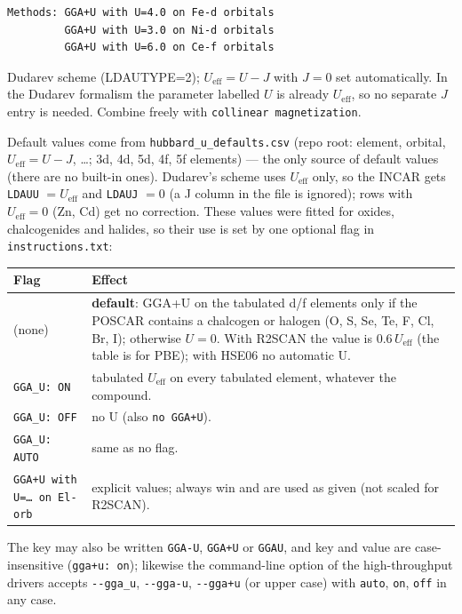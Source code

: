 \documentclass[11pt,a4paper]{scrartcl}
\newcommand{\thead}{\rowcolor{lightblue}}
\begin{document}
\begin{lstlisting}
Methods: GGA+U with U=4.0 on Fe-d orbitals
         GGA+U with U=3.0 on Ni-d orbitals
         GGA+U with U=6.0 on Ce-f orbitals
\end{lstlisting}

Dudarev scheme (LDAUTYPE=2); $U_{\mathrm{eff}} = U - J$ with $J = 0$ set
automatically.  In the Dudarev formalism the parameter labelled $U$ is already
$U_{\mathrm{eff}}$, so no separate $J$ entry is needed.
Combine freely with \texttt{collinear magnetization}.

Default values come from \texttt{hubbard\_u\_defaults.csv} (repo root:
element, orbital, $U_{\mathrm{eff}} = U - J$, \ldots; 3d, 4d, 5d, 4f, 5f
elements) --- the only source of default values (there are no built-in
ones).  Dudarev's scheme uses $U_{\mathrm{eff}}$ only, so the INCAR gets
\texttt{LDAUU} $= U_{\mathrm{eff}}$ and \texttt{LDAUJ} $= 0$ (a J column in
the file is ignored); rows with $U_{\mathrm{eff}} = 0$ (Zn, Cd) get no
correction.  These values were fitted
for oxides, chalcogenides and halides, so their use is set by one optional flag in
\texttt{instructions.txt}:

\begin{tabularx}{\linewidth}{@{}lX@{}}
\thead
Flag & Effect \\ \midrule
(none) & \textbf{default}: GGA+U on the tabulated d/f elements only if the
  POSCAR contains a chalcogen or halogen (O, S, Se, Te, F, Cl, Br, I);
  otherwise $U = 0$.  With R2SCAN the value is $0.6\,U_{\mathrm{eff}}$ (the table is for
  PBE); with HSE06 no automatic U. \\
\texttt{GGA\_U: ON} & tabulated $U_{\mathrm{eff}}$ on every tabulated element,
  whatever the compound. \\
\texttt{GGA\_U: OFF} & no U (also \texttt{no GGA+U}). \\
\texttt{GGA\_U: AUTO} & same as no flag. \\
\texttt{GGA+U with U=\ldots\ on El-orb} & explicit values; always win and are used as
  given (not scaled for R2SCAN). \\
\bottomrule
\end{tabularx}

The key may also be written \texttt{GGA-U}, \texttt{GGA+U} or \texttt{GGAU},
and key and value are case-insensitive (\texttt{gga+u: on}); likewise the
command-line option of the high-throughput drivers accepts
\texttt{-{}-gga\_u}, \texttt{-{}-gga-u}, \texttt{-{}-gga+u} (or upper case)
with \texttt{auto}, \texttt{on}, \texttt{off} in any case.
\end{document}
